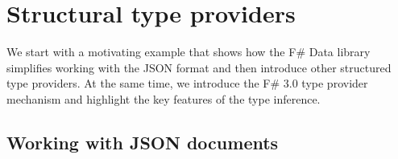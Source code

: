 \documentclass[10pt]{sigplanconf}
\begin{document}

\section{Structural type providers}
\label{sec:structural}

We start with a motivating example that shows how the F\# Data library simplifies working with
the JSON format and then introduce other structured type providers. At the same time, we 
introduce the F\# 3.0 type provider mechanism and highlight the key features of the type inference.


\subsection{Working with JSON documents}
\label{sec:structural-json}
\end{document}
